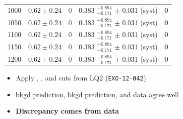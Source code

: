 \documentclass[bigger]{beamer}
\providecommand{\alert}[1]{\textbf{#1}}
\begin{document}
\begin{frame}
{\begin{tabular}{| c | c | c | c | c |}
1000  &  $ 0.62 \pm 0.24 $     & 0    & 0.383 $ _{-0.171}^{+0.894}$   $\pm$ 0.031 (syst)  &   0 \\             
1050  &  $ 0.62 \pm 0.24 $     & 0    & 0.383 $ _{-0.171}^{+0.894}$   $\pm$ 0.031 (syst)  &   0 \\             
1100  &  $ 0.62 \pm 0.24 $     & 0    & 0.383 $ _{-0.171}^{+0.894}$   $\pm$ 0.031 (syst)  &   0 \\             
1150  &  $ 0.62 \pm 0.24 $     & 0    & 0.383 $ _{-0.171}^{+0.894}$   $\pm$ 0.031 (syst)  &   0 \\             
1200  &  $ 0.62 \pm 0.24 $     & 0    & 0.383 $ _{-0.171}^{+0.894}$   $\pm$ 0.031 (syst)  &   0 \\             
\hline
\hline 
\end{tabular}
}
\label{sec-1-7-1-2}

\begin{itemize}
\scriptsize
\item Apply \ST, \mejmin, and \mll cuts from LQ2 (\texttt{EXO-12-042})
\item \eejj bkgd prediction, \mumujj bkgd prediction, and \mumujj data agree well
\item \alert{Discrepancy comes from \eejj data}
\end{itemize}
\end{frame}
\end{document}
